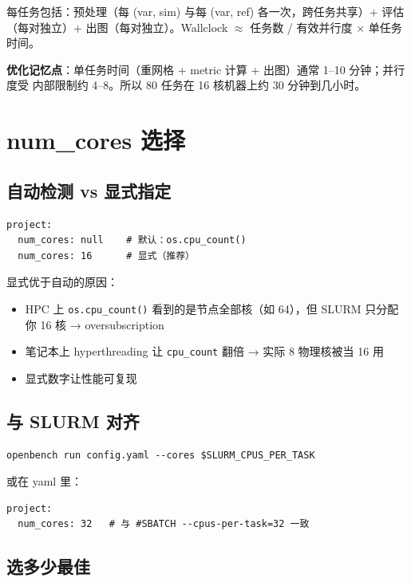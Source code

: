 每任务包括：预处理（每 (var, sim) 与每 (var, ref) 各一次，跨任务共享）+ 评估（每对独立）+ 出图（每对独立）。Wallclock $\approx$ 任务数 / 有效并行度 × 单任务时间。

\textbf{优化记忆点}：单任务时间（重网格 + metric 计算 + 出图）通常 1--10 分钟；并行度受  内部限制约 4--8。所以 80 任务在 16 核机器上约 30 分钟到几小时。

\section{num\_cores 选择}

\subsection{自动检测 vs 显式指定}

\begin{verbatim}
project:
  num_cores: null    # 默认：os.cpu_count()
  num_cores: 16      # 显式（推荐）
\end{verbatim}

显式优于自动的原因：

\begin{itemize}
  \item HPC 上 \texttt{os.cpu_count()} 看到的是节点全部核（如 64），但 SLURM 只分配你 16 核 → oversubscription
  \item 笔记本上 hyperthreading 让 \texttt{cpu\_count} 翻倍 → 实际 8 物理核被当 16 用
  \item 显式数字让性能可复现
\end{itemize}

\subsection{与 SLURM 对齐}

\begin{verbatim}
openbench run config.yaml --cores $SLURM_CPUS_PER_TASK
\end{verbatim}

或在 yaml 里：

\begin{verbatim}
project:
  num_cores: 32   # 与 #SBATCH --cpus-per-task=32 一致
\end{verbatim}

\subsection{选多少最佳}

